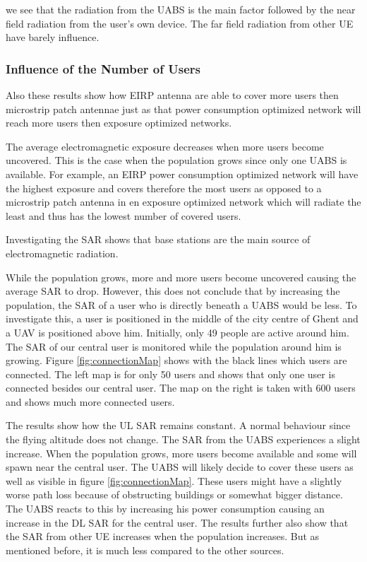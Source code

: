 \documentclass[twocolumn]{phdsymp} %
\begin{document}
we see 
that the radiation from the \gls{UABS} is the main factor followed by the near field radiation from the user's own device.
The far field radiation from other \gls{UE} have barely influence. 

\subsubsection{Influence of the Number of Users}

Also these results show how EIRP antenna are able to cover more users then microstrip patch antennae
just as that power consumption optimized network will reach more users then exposure optimized networks.

The average electromagnetic exposure decreases when more users become uncovered. This is the case when the 
population grows since only one \gls{UABS} is available. For example, an EIRP power consumption optimized network
will have the highest exposure and covers therefore the most users as opposed to a microstrip patch antenna in 
en exposure optimized network which will radiate the least and thus has the lowest number of covered users.

Investigating the \gls{SAR} shows that base stations are the main source of electromagnetic radiation.

While the population grows, more and more users become uncovered causing the average SAR to drop. 
However, this does not conclude that  by increasing the population, the SAR of a user who is directly beneath a \gls{UABS} would be less.
To investigate this, a user is positioned in the middle of the city centre of Ghent and a \gls{UAV} is positioned above him. Initially, only 
49 people are active around him. The \gls{SAR} of our central user is monitored while the population around him is growing.
Figure \ref{fig:connectionMap} shows with the black lines which users are connected. The left map is for only 50 users and 
shows that only one user is connected besides our central user. The map on the right is taken with 600 users and shows much more connected users.

The results show how the \gls{UL} \gls{SAR} remains constant. A normal behaviour since the flying altitude does not change.
The \gls{SAR} from the \gls{UABS} experiences a slight increase. When the population grows, more users become available 
and some will spawn near the central user. The \gls{UABS} will likely decide to cover these users as well as visible in figure \ref{fig:connectionMap}.
These users might have a slightly 
worse path loss because of obstructing buildings or somewhat bigger distance. The \gls{UABS} reacts to this by increasing 
his power consumption causing an increase in the \gls{DL} \gls{SAR} for the central user. The results further also show 
that the \gls{SAR} from other \gls{UE} increases when the population increases. But as mentioned  before, it is much less 
compared to the other sources.
\end{document}
